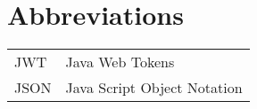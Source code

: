 \listoffigures
{}
\newpage
\section*{Abbreviations}
\begin{table}[h]
    \begin{tabular}{l l}
         JWT & \hspace{2in} Java Web Tokens \vspace{2mm} \\
         JSON & \hspace{2in} Java Script Object Notation \vspace{2mm} \\
    \end{tabular}
\end{table}
\newpage
